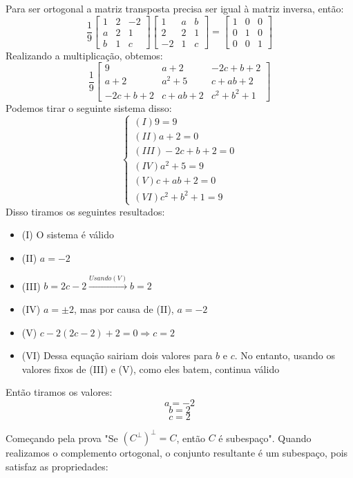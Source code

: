 \documentclass{homework}
\begin{document}
\exercise*
Para ser ortogonal a matriz transposta precisa ser igual à matriz inversa, então:
\[
\frac{1}{9}
\begin{bmatrix}
1 & 2 & -2\\
a & 2 & 1\\
b & 1 & c
\end{bmatrix}
\begin{bmatrix}
1 & a & b\\
2 & 2 & 1\\
-2 & 1 & c
\end{bmatrix}
=
\begin{bmatrix}
1 & 0 & 0\\
0 & 1 & 0\\
0 & 0 & 1
\end{bmatrix}
\]
Realizando a multiplicação, obtemos:
\[
\frac{1}{9}
\begin{bmatrix}
9 & a+2 & -2c+b+2\\
a+2 & a^2+5 & c+ab+2\\
-2c+b+2 & c+ab+2 & c^2+b^2+1
\end{bmatrix}
\]
Podemos tirar o seguinte sistema disso:
\[
\begin{cases}
(I) 9 = 9\\
(II) a+2 = 0\\
(III) -2c+b+2 = 0\\
(IV) a^2+5=9\\
(V) c+ab+2=0\\
(VI) c^2+b^2+1=9
\end{cases}
\]
Disso tiramos os seguintes resultados:
\begin{itemize}
    \item (I) O sistema é válido
    \item (II) $a=-2$
    \item (III) $b=2c-2 \xrightarrow{Usando (V)} b=2$
    \item (IV) $a=\pm2$, mas por causa de (II), $a=-2$
    \item (V) $c-2(2c-2)+2=0 \Rightarrow c=2$
    \item (VI) Dessa equação sairiam dois valores para $b$ e $c$. No entanto, usando os valores fixos de (III) e (V), como eles batem, continua válido
\end{itemize}
Então tiramos os valores:
\[a=-2\]
\[b=2\]
\[c=2\]

\exercise*
Começando pela prova "Se $(C^\perp)^\perp = C$, então $C$ é subespaço". Quando realizamos o complemento ortogonal, o conjunto resultante é um subespaço, pois satisfaz as propriedades:
\end{document}
